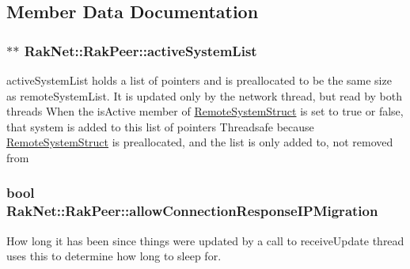 \subsection{Member Data Documentation}
\hypertarget{class_rak_net_1_1_rak_peer_ad8cab96454717bfcbc2cfda6f88d8cc0}{
\subsubsection[{active\-System\-List}]{$\ast$$\ast$ Rak\-Net\-::\-Rak\-Peer\-::active\-System\-List\hspace{0.3cm}{\ttfamily [protected]}}}\label{class_rak_net_1_1_rak_peer_ad8cab96454717bfcbc2cfda6f88d8cc0}
active\-System\-List holds a list of pointers and is preallocated to be the same size as remote\-System\-List. It is updated only by the network thread, but read by both threads When the is\-Active member of \hyperlink{struct_rak_net_1_1_rak_peer_1_1_remote_system_struct}{Remote\-System\-Struct} is set to true or false, that system is added to this list of pointers Threadsafe because \hyperlink{struct_rak_net_1_1_rak_peer_1_1_remote_system_struct}{Remote\-System\-Struct} is preallocated, and the list is only added to, not removed from \hypertarget{class_rak_net_1_1_rak_peer_a9d820f9f09600401b3689a599242832a}{
\subsubsection[{allow\-Connection\-Response\-I\-P\-Migration}]{\setlength{\rightskip}{0pt plus 5cm}bool Rak\-Net\-::\-Rak\-Peer\-::allow\-Connection\-Response\-I\-P\-Migration\hspace{0.3cm}{\ttfamily [protected]}}}\label{class_rak_net_1_1_rak_peer_a9d820f9f09600401b3689a599242832a}


How long it has been since things were updated by a call to receive\-Update thread uses this to determine how long to sleep for. 


